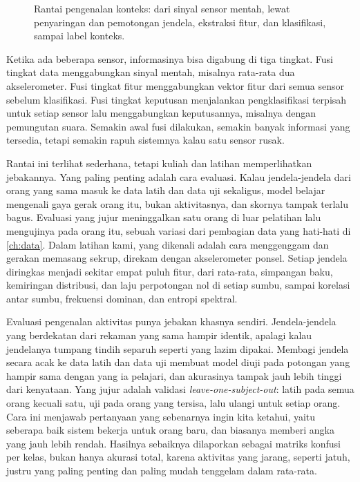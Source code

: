 \begin{figure}[ht]
\centering
{}
\caption{Rantai pengenalan konteks: dari sinyal sensor mentah, lewat penyaringan dan pemotongan jendela,
ekstraksi fitur, dan klasifikasi, sampai label konteks.}
\label{fig:rantai}
\end{figure}

Ketika ada beberapa sensor, informasinya bisa digabung di tiga tingkat. Fusi tingkat data menggabungkan sinyal
mentah, misalnya rata-rata dua akselerometer. Fusi tingkat fitur menggabungkan vektor fitur dari semua sensor
sebelum klasifikasi. Fusi tingkat keputusan menjalankan pengklasifikasi terpisah untuk setiap sensor lalu
menggabungkan keputusannya, misalnya dengan pemungutan suara. Semakin awal fusi dilakukan, semakin banyak
informasi yang tersedia, tetapi semakin rapuh sistemnya kalau satu sensor rusak.

Rantai ini terlihat sederhana, tetapi kuliah dan latihan memperlihatkan jebakannya. Yang paling penting adalah cara
evaluasi. Kalau jendela-jendela dari orang yang sama masuk ke data latih dan data uji sekaligus, model belajar
mengenali gaya gerak orang itu, bukan aktivitasnya, dan skornya tampak terlalu bagus. Evaluasi yang jujur
meninggalkan satu orang di luar pelatihan lalu mengujinya pada orang itu, sebuah variasi dari pembagian data yang
hati-hati di \cref{ch:data}. Dalam latihan kami, yang dikenali adalah cara menggenggam dan gerakan memasang sekrup,
direkam dengan akselerometer ponsel. Setiap jendela diringkas menjadi sekitar empat puluh fitur, dari rata-rata,
simpangan baku, kemiringan distribusi, dan laju perpotongan nol di setiap sumbu, sampai korelasi antar sumbu,
frekuensi dominan, dan entropi spektral.

Evaluasi pengenalan aktivitas punya jebakan khasnya sendiri. Jendela-jendela yang berdekatan dari rekaman yang sama hampir
identik, apalagi kalau jendelanya tumpang tindih separuh seperti yang lazim dipakai. Membagi jendela secara acak ke data latih dan
data uji membuat model diuji pada potongan yang hampir sama dengan yang ia pelajari, dan akurasinya tampak jauh lebih tinggi dari
kenyataan. Yang jujur adalah validasi \emph{leave-one-subject-out}: latih pada semua orang kecuali satu, uji pada orang yang tersisa,
lalu ulangi untuk setiap orang. Cara ini menjawab pertanyaan yang sebenarnya ingin kita ketahui, yaitu seberapa baik sistem bekerja
untuk orang baru, dan biasanya memberi angka yang jauh lebih rendah. Hasilnya sebaiknya dilaporkan sebagai matriks konfusi per kelas,
bukan hanya akurasi total, karena aktivitas yang jarang, seperti jatuh, justru yang paling penting dan paling mudah tenggelam dalam
rata-rata.

